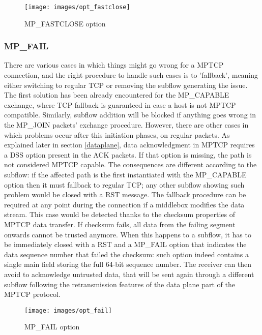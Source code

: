 \begin{figure}[!htb]
\centering
\texttt{[image: images/opt\_fastclose]}
\caption{MP\_FASTCLOSE option}
\label{fig:opt_fastclose}
\end{figure}

\subsubsection{MP\_FAIL}
There are various cases in which things might go wrong for a MPTCP connection, and the right procedure to handle such cases is to 'fallback', meaning either switching to regular TCP or removing the subflow generating the issue. The first solution has been already encountered for the MP\_CAPABLE exchange, where TCP fallback is guaranteed in case a host is not MPTCP compatible. Similarly, subflow addition will be blocked if anything goes wrong in the MP\_JOIN packets' exchange procedure. However, there are other cases in which problems occur after this initiation phases, on regular packets. 
As explained later in section \ref{dataplane}, data acknowledgment in MPTCP requires a DSS option present in the ACK packets. If that option is missing, the path is not considered MPTCP capable. The consequences are different according to the subflow: if the affected path is the first instantiated with the MP\_CAPABLE option then it must fallback to regular TCP; any other subflow showing such problem would be closed with a RST message. 
The fallback procedure can be required at any point during the connection if a middlebox modifies the data stream. This case would be detected thanks to the checksum properties of MPTCP data transfer. If checksum fails, all data from the failing segment onwards cannot be trusted anymore. When this happens to a subflow, it has to be immediately closed with a RST and a MP\_FAIL option that indicates the data sequence number that failed the checksum: such option indeed contains a single main field storing the full 64-bit sequence number. The receiver can then avoid to acknowledge untrusted data, that will be sent again through a different subflow following the retransmission features of the data plane part of the MPTCP protocol. 

\begin{figure}[!htb]
\centering
\texttt{[image: images/opt\_fail]}
\caption{MP\_FAIL option}
\label{fig:opt_fail}
\end{figure}


